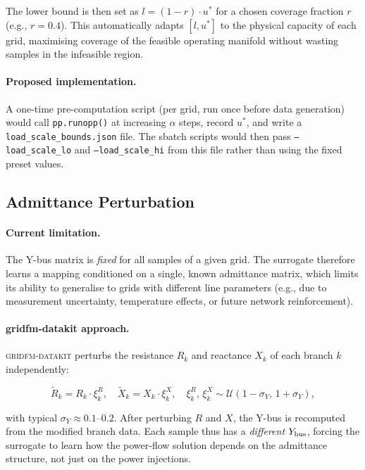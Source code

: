 \documentclass{article}
\begin{document}
The lower bound is then set as $l = (1 - r) \cdot u^*$ for a chosen coverage
fraction $r$ (e.g., $r = 0.4$).  This automatically adapts $[l, u^*]$ to the
physical capacity of each grid, maximising coverage of the feasible operating
manifold without wasting samples in the infeasible region.

\paragraph{Proposed implementation.}
A one-time pre-computation script (per grid, run once before data generation)
would call \texttt{pp.runopp()} at increasing $\alpha$ steps, record $u^*$,
and write a \texttt{load\_scale\_bounds.json} file.  The sbatch scripts would
then pass \texttt{--load\_scale\_lo} and \texttt{--load\_scale\_hi}
from this file rather than using the fixed preset values.

\subsection{Admittance Perturbation}

\paragraph{Current limitation.}
The Y-bus matrix is \emph{fixed} for all samples of a given grid.  The
surrogate therefore learns a mapping conditioned on a single, known admittance
matrix, which limits its ability to generalise to grids with different line
parameters (e.g., due to measurement uncertainty, temperature effects, or
future network reinforcement).

\paragraph{gridfm-datakit approach.}
\textsc{gridfm-datakit} perturbs the resistance $R_k$ and reactance $X_k$ of
each branch $k$ independently:

\begin{equation}
  \tilde{R}_k = R_k \cdot \xi^R_k,\quad
  \tilde{X}_k = X_k \cdot \xi^X_k,\quad
  \xi^R_k,\, \xi^X_k \sim \mathcal{U}(1-\sigma_Y,\, 1+\sigma_Y),
  \label{eq:admittance_pert}
\end{equation}

with typical $\sigma_Y \approx 0.1$--$0.2$.  After perturbing $R$ and $X$,
the Y-bus is recomputed from the modified branch data.  Each sample thus has
a \emph{different} $Y_{\rm bus}$, forcing the surrogate to learn how the
power-flow solution depends on the admittance structure, not just on the power
injections.
\end{document}
